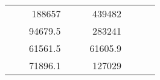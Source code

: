 \begin{table}[H]
\begin{tabular}{|ccrccrccc}
\multicolumn{1}{|c|}{\cellcolor[HTML]{FFFFC7}}                                & \multicolumn{1}{c|}{\cellcolor[HTML]{DDFDFF}}                      & \multicolumn{1}{r|}{\cellcolor[HTML]{DAE8FC}188657}    & \multicolumn{1}{c|}{\cellcolor[HTML]{FFFFC7}}                                & \multicolumn{1}{c|}{\cellcolor[HTML]{DDFDFF}}                       & \multicolumn{1}{r|}{\cellcolor[HTML]{DDFDFF}439482}    &                                                                              &                                                                    &                                                        \\ \cline{3-3} \cline{6-6}
\multicolumn{1}{|c|}{\cellcolor[HTML]{FFFFC7}}                                & \multicolumn{1}{c|}{\cellcolor[HTML]{DDFDFF}}                      & \multicolumn{1}{r|}{\cellcolor[HTML]{DDFDFF}94679.5}   & \multicolumn{1}{c|}{\cellcolor[HTML]{FFFFC7}}                                & \multicolumn{1}{c|}{\cellcolor[HTML]{DDFDFF}}                       & \multicolumn{1}{r|}{\cellcolor[HTML]{DAE8FC}283241}    &                                                                              &                                                                    &                                                        \\ \cline{3-3} \cline{6-6}
\multicolumn{1}{|c|}{\cellcolor[HTML]{FFFFC7}}                                & \multicolumn{1}{c|}{\cellcolor[HTML]{DDFDFF}}                      & \multicolumn{1}{r|}{\cellcolor[HTML]{DAE8FC}61561.5}   & \multicolumn{1}{c|}{\cellcolor[HTML]{FFFFC7}}                                & \multicolumn{1}{c|}{\cellcolor[HTML]{DDFDFF}}                       & \multicolumn{1}{r|}{\cellcolor[HTML]{DDFDFF}61605.9}   &                                                                              &                                                                    &                                                        \\ \cline{3-3} \cline{6-6}
\multicolumn{1}{|c|}{\cellcolor[HTML]{FFFFC7}}                                & \multicolumn{1}{c|}{\cellcolor[HTML]{DDFDFF}}                      & \multicolumn{1}{r|}{\cellcolor[HTML]{DDFDFF}71896.1}   & \multicolumn{1}{c|}{\cellcolor[HTML]{FFFFC7}}                                & \multicolumn{1}{c|}{\cellcolor[HTML]{DDFDFF}}                       & \multicolumn{1}{r|}{\cellcolor[HTML]{DAE8FC}127029}    &                                                                              &                                                                    &                                                        \\ \cline{3-3} \cline{6-6}

\end{tabular}
\end{table}
